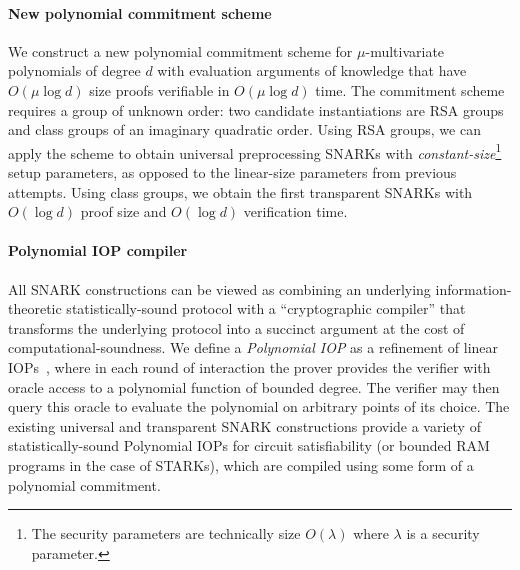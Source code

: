 \paragraph{New polynomial commitment scheme} We construct a new polynomial commitment scheme for $\mu$-multivariate polynomials of degree $d$ with evaluation arguments of knowledge that have $O(\mu \log d)$ size proofs verifiable in $O(\mu \log d)$ time. The commitment scheme requires a group of unknown order: two candidate instantiations are RSA groups and class groups of an imaginary quadratic order. Using RSA groups, we can apply the scheme to obtain universal preprocessing SNARKs with \emph{constant-size}\footnote{The security parameters are technically size $O(\lambda)$ where $\lambda$ is a security parameter.}
setup parameters, as opposed to the linear-size parameters from previous attempts. Using class groups, we obtain the first transparent SNARKs with $O(\log d)$ proof size and $O(\log d)$ verification time.

\paragraph{Polynomial IOP compiler} %
All SNARK constructions can be viewed as combining an underlying information-theoretic statistically-sound protocol with a ``cryptographic compiler'' that transforms the underlying protocol into a succinct argument at the cost of computational-soundness. 
We define a \emph{Polynomial IOP} as a refinement of linear IOPs~\cite{CC:IKO07,C:BBCGI19}, where in each round of interaction the prover provides the verifier with oracle access to a polynomial function of bounded degree. The verifier may then query this oracle to evaluate the polynomial on arbitrary points of its choice. The existing universal and transparent SNARK constructions provide a variety of statistically-sound Polynomial IOPs for circuit satisfiability (or bounded RAM programs in the case of STARKs), which are compiled using some form of a polynomial commitment. 

